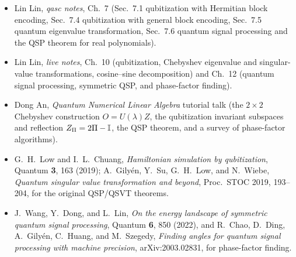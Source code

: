 \readingsection
\begin{itemize}[leftmargin=1.4em]
  \item Lin Lin, \emph{qasc notes}, Ch.~7 (Sec.~7.1 qubitization with Hermitian block
        encoding, Sec.~7.4 qubitization with general block encoding, Sec.~7.5
        quantum eigenvalue transformation, Sec.~7.6 quantum signal processing and
        the QSP theorem for real polynomials).
  \item Lin Lin, \emph{live notes}, Ch.~10 (qubitization, Chebyshev eigenvalue and
        singular-value transformations, cosine--sine decomposition) and Ch.~12
        (quantum signal processing, symmetric QSP, and phase-factor finding).
  \item Dong An, \emph{Quantum Numerical Linear Algebra} tutorial talk (the
        $2\times2$ Chebyshev construction $O=U(\lambda)Z$, the qubitization
        invariant subspaces and reflection $Z_\Pi=2\Pi-\mathbb{I}$, the QSP theorem, and a
        survey of phase-factor algorithms).
  \item G.~H.~Low and I.~L.~Chuang, \emph{Hamiltonian simulation by qubitization},
        Quantum \textbf{3}, 163 (2019); A.~Gily\'en, Y.~Su, G.~H.~Low, and
        N.~Wiebe, \emph{Quantum singular value transformation and beyond},
        Proc.\ STOC 2019, 193--204, for the original QSP/QSVT theorems.
  \item J.~Wang, Y.~Dong, and L.~Lin, \emph{On the energy landscape of symmetric
        quantum signal processing}, Quantum \textbf{6}, 850 (2022), and R.~Chao,
        D.~Ding, A.~Gily\'en, C.~Huang, and M.~Szegedy, \emph{Finding angles for
        quantum signal processing with machine precision}, arXiv:2003.02831, for
        phase-factor finding.
\end{itemize}
